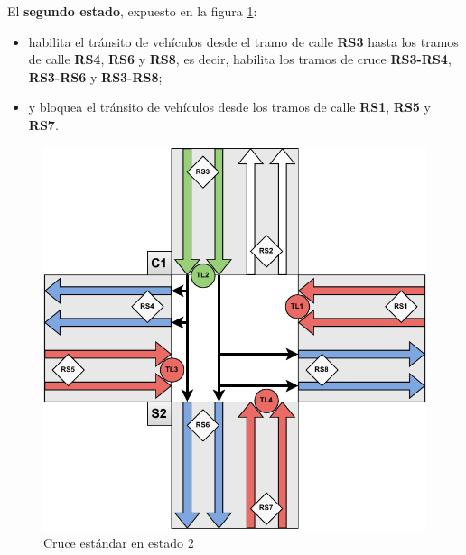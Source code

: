 \newpage
El \textbf{segundo estado}, expuesto en la figura \ref{fig:cruce_estandar_estado_2}:
\begin{itemize}
    \item habilita el tránsito de vehículos desde el tramo de calle \textbf{RS3} hasta los tramos de calle \textbf{RS4}, \textbf{RS6} y \textbf{RS8}, es decir, habilita los tramos de cruce \textbf{RS3-RS4}, \textbf{RS3-RS6} y \textbf{RS3-RS8};
    \item y bloquea el tránsito de vehículos desde los tramos de calle \textbf{RS1}, \textbf{RS5} y \textbf{RS7}.
\end{itemize}
\begin{figure}[H]
    \centering
    \includegraphics[width=1\linewidth]{text/image/DCruc-CE-Estado2.pdf}
    \caption{Cruce estándar en estado 2}
    \label{fig:cruce_estandar_estado_2}
\end{figure}

